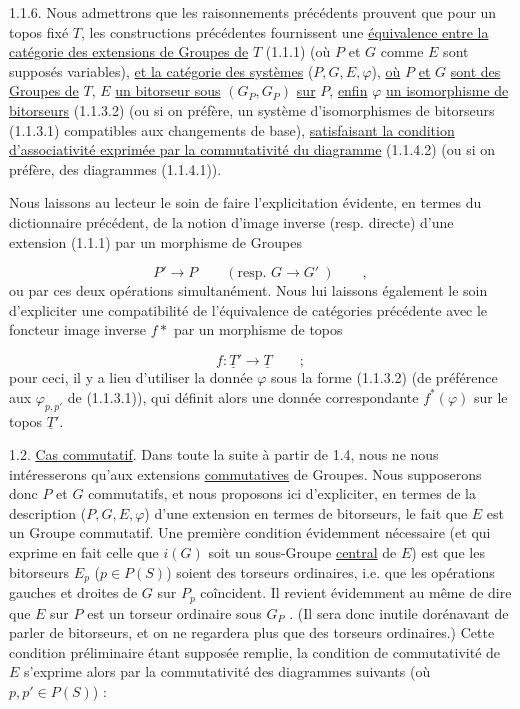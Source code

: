 1.1.6.  Nous admettrons que les raisonnements précédents prouvent que pour un topos fixé \underline{$T$}, les constructions précédentes fournissent une \underline{équivalence entre la catégorie des extensions de Groupes de} \underline{$T$} (1.1.1) (où $P$ et $G$ comme $E$ sont supposés variables), \underline{et la catégorie des systèmes} ($P,G,E,\varphi$), \underline{où} $P$ \underline{et} $G$ \underline{sont des Groupes de} \underline{$T$}, $E$ \underline{un bitorseur sous} $(G_P,G_P)$ \underline{sur} $P$, \underline{enfin} $\varphi$ \underline{un isomorphisme de bitorseurs} (1.1.3.2) (ou si on préfère, un système d'isomorphismes de bitorseurs (1.1.3.1) compatibles aux changements de base), \underline{satisfaisant la condition d'associativité exprimée par la commutativité du diagramme} (1.1.4.2) (ou si on préfère, des diagrammes (1.1.4.1)).

Nous laissons au lecteur le soin de faire l'explicitation évidente, en termes du dictionnaire précédent, de la notion d'image inverse (resp. directe) d'une extension (1.1.1) par un morphisme de Groupes

\begin{equation*}
P' \longrightarrow P \qquad (\text{resp. } G \longrightarrow G'\ ) \qquad ,
\end{equation*}
ou par ces deux opérations simultanément. Nous lui laissons également le soin d'expliciter une compatibilité de l'équivalence de catégories précédente avec le foncteur image inverse $f*$ par un morphisme de topos

\begin{equation*}
f : \underline{T}' \longrightarrow \underline{T} \qquad ;
\end{equation*}
pour ceci, il y a lieu d'utiliser la donnée $\varphi$ sous la forme (1.1.3.2) (de préférence aux $\varphi_{p,p'}$ de (1.1.3.1)), qui définit alors une donnée correspondante $f^*(\varphi)$ sur le topos $\underline{T}'$.

1.2. \underline{Cas commutatif}. Dans toute la suite à partir de 1.4, nous ne nous intéresserons qu'aux extensions \underline{commutatives} de Groupes. Nous supposerons donc $P$ et $G$ commutatifs, et nous proposons ici d'expliciter, en termes
de la description ($P,G,E,\varphi$) d'une extension en termes de bitorseurs, le fait que $E$ est un Groupe commutatif. Une première condition évidemment nécessaire (et qui exprime en fait celle que $i(G)$ soit un sous-Groupe \underline{central} de $E$) est que les bitorseurs $E_p$ ($p \in P(S)$) soient des torseurs ordinaires, i.e. que les opérations gauches et droites de $G$ sur $P_p$ coîncident. Il revient évidemment au même de dire que $E$ sur $P$ est un torseur ordinaire sous $G_P$ . (Il sera donc inutile dorénavant de parler de bitorseurs, et on ne regardera plus que des torseurs ordinaires.) Cette condition préliminaire étant supposée remplie, la condition de commutativité de $E$ s'exprime alors par la commutativité des diagrammes suivants (où $p,p' \in P(S)$) :

